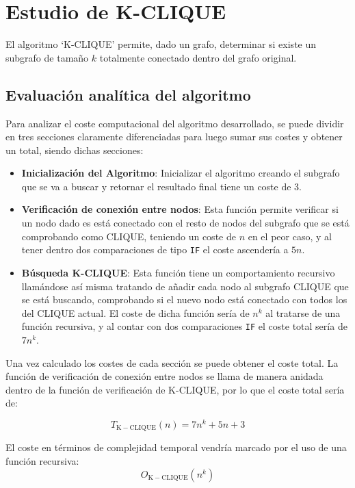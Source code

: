 \section{Estudio de K-CLIQUE}\label{sec:clique}
El algoritmo `K-CLIQUE' permite, dado un grafo, determinar si existe un subgrafo de tamaño $k$ totalmente conectado dentro del grafo original.


\subsection*{Evaluación analítica del algoritmo}
Para analizar el coste computacional del algoritmo desarrollado, se puede dividir en tres secciones claramente diferenciadas para luego sumar sus costes y obtener un total, siendo dichas secciones: 

\begin{itemize}
    \item \textbf{Inicialización del Algoritmo}: Inicializar el algoritmo creando el subgrafo que se va a buscar y retornar el resultado final tiene un coste de 3.
    \item \textbf{Verificación de conexión entre nodos}: Esta función permite verificar si un nodo dado es está conectado con el resto de nodos del subgrafo que se está comprobando como CLIQUE, teniendo un coste de $n$ en el peor caso, y al tener dentro dos comparaciones de tipo \texttt{IF} el coste ascendería a $5n$.
    \item \textbf{Búsqueda K-CLIQUE}: Esta función tiene un comportamiento recursivo llamándose así misma tratando de añadir cada nodo al subgrafo CLIQUE que se está buscando, comprobando si el nuevo nodo está conectado con todos los del CLIQUE actual.
    El coste de dicha función sería de $n^k$ al tratarse de una función recursiva, y al contar con dos comparaciones \texttt{IF} el coste total sería de $7n^k$.
\end{itemize}

Una vez calculado los costes de cada sección se puede obtener el coste total. La función de verificación de conexión entre nodos se llama de  manera anidada dentro de la función de verificación de K-CLIQUE, por lo que el coste total sería de:

\begin{equation}
    T_{\mathrm{K-CLIQUE}}(n) = 7n^k + 5n +3
\end{equation}

El coste en términos de complejidad temporal vendría marcado por el uso de una función recursiva: 
\begin{equation}
    O_{\mathrm{K-CLIQUE}}(n^k) 
\end{equation}



